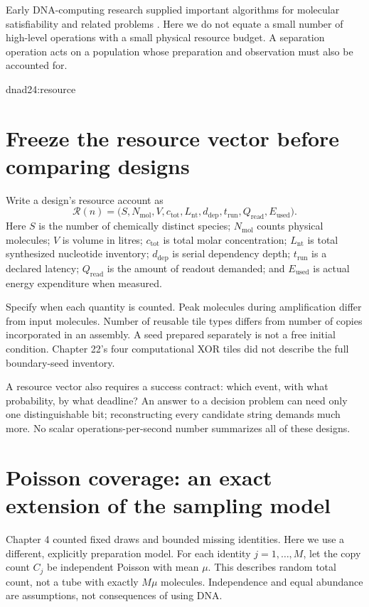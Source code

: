 Early DNA-computing research supplied important algorithms for molecular
satisfiability and related problems \cite{Boneh1996}. Here we do not equate
a small number of high-level operations with a small physical resource budget.
A separation operation acts on a population whose preparation and observation
must also be accounted for.

{dnad24:resource}

\section{Freeze the resource vector before comparing designs}
Write a design's resource account as
\begin{equation}
\mathcal R(n)=
\bigl(S,N_{\mathrm{mol}},V,c_{\mathrm{tot}},L_{\mathrm{nt}},
d_{\mathrm{dep}},t_{\mathrm{run}},Q_{\mathrm{read}},E_{\mathrm{used}}\bigr).
\label{dnad24:vector}
\end{equation}
Here $S$ is the number of chemically distinct species; $N_{\mathrm{mol}}$ counts
physical molecules; $V$ is volume in litres; $c_{\mathrm{tot}}$ is total molar
concentration; $L_{\mathrm{nt}}$ is total synthesized nucleotide inventory;
$d_{\mathrm{dep}}$ is serial dependency depth; $t_{\mathrm{run}}$ is a declared
latency; $Q_{\mathrm{read}}$ is the amount of readout demanded; and
$E_{\mathrm{used}}$ is actual energy expenditure when measured.

Specify when each quantity is counted. Peak molecules during amplification differ
from input molecules. Number of reusable tile types differs from number of copies
incorporated in an assembly. A seed prepared separately is not a free initial
condition. Chapter 22's four computational XOR tiles did not describe the full
boundary-seed inventory.

A resource vector also requires a success contract: which event, with what
probability, by what deadline? An answer to a decision problem can need only one
distinguishable bit; reconstructing every candidate string demands much more.
No scalar operations-per-second number summarizes all of these designs.

\section{Poisson coverage: an exact extension of the sampling model}
Chapter 4 counted fixed draws and bounded missing identities. Here we use a
different, explicitly  preparation model. For each identity
$j=1,\ldots,M$, let the copy count $C_j$ be independent Poisson with mean $\mu$.
This describes random total count, not a tube with exactly $M\mu$ molecules.
Independence and equal abundance are assumptions, not consequences of using DNA.

